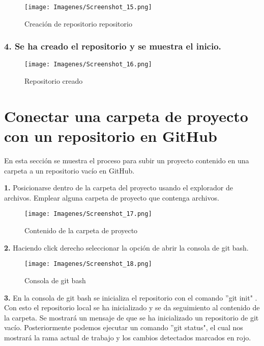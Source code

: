 \begin{figure}[H]
    \centering
    \texttt{[image: Imagenes/Screenshot\_15.png]}
    \caption{Creación de repositorio repositorio}
    \label{fig:onlinerepo1}
\end{figure}

\subsubsection{4. Se ha creado el repositorio y se muestra el inicio.}

\begin{figure}[H]
    \centering
    \texttt{[image: Imagenes/Screenshot\_16.png]}
    \caption{Repositorio creado}
    \label{fig:onlinerepo1}
\end{figure}

\section{Conectar una carpeta de proyecto con un repositorio en GitHub}

En esta sección se muestra el proceso para subir un proyecto contenido en una carpeta a un repositorio vacío en GitHub.

\noindent \textbf{1.} Posicionarse dentro de la carpeta del proyecto usando el explorador de archivos. Emplear alguna carpeta de proyecto que contenga archivos.

\begin{figure}[H]
    \centering
    \texttt{[image: Imagenes/Screenshot\_17.png]}
    \caption{Contenido de la carpeta de proyecto}
    \label{fig:onlinerepo1}
\end{figure}

\noindent \textbf{2.} Haciendo click derecho seleccionar la opción de abrir la consola de git bash.

\begin{figure}[H]
    \centering
    \texttt{[image: Imagenes/Screenshot\_18.png]}
    \caption{Consola de git bash}
    \label{fig:onlinerepo1}
\end{figure}

\noindent \textbf{3.} En la consola de git bash se inicializa el repositorio con el comando ''git init" . Con esto el repositorio local se ha inicializado y se da seguimiento al contenido de la carpeta. Se mostrará un mensaje de que se ha inicializado un repositorio de git vacío. Posteriormente podemos ejecutar un comando ''git status", el cual nos mostrará la rama actual de trabajo y los cambios detectados marcados en rojo.

